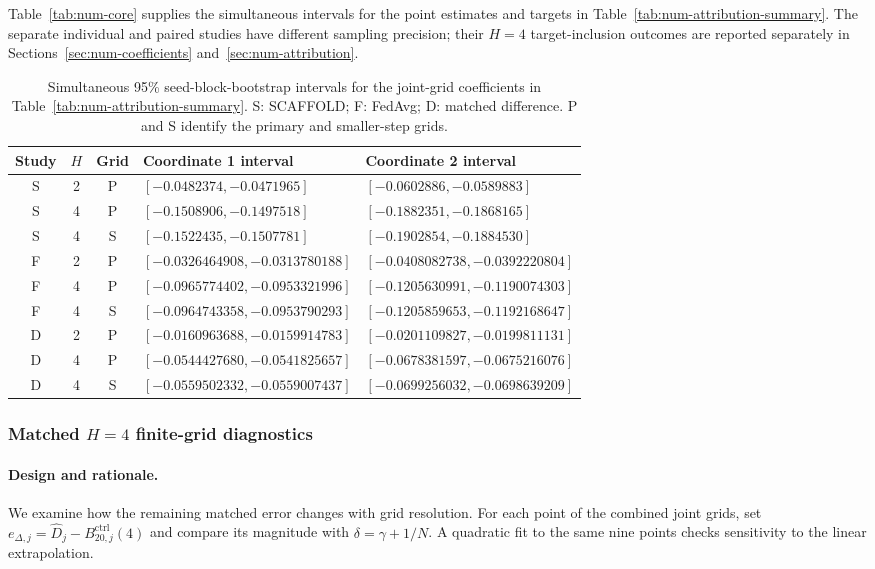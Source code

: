 Table~\ref{tab:num-core} supplies the simultaneous intervals for the point
estimates and targets in Table~\ref{tab:num-attribution-summary}.
The separate individual and paired studies have different sampling
precision; their $H=4$ target-inclusion outcomes are reported separately
in Sections~\ref{sec:num-coefficients} and~\ref{sec:num-attribution}.

\begin{table}[tbp]
\centering\small
\setlength{\tabcolsep}{4pt}
\caption{Simultaneous 95\% seed-block-bootstrap intervals for the
joint-grid coefficients in Table~\ref{tab:num-attribution-summary}.
S: SCAFFOLD; F: FedAvg; D: matched difference.
P and S identify the primary and smaller-step grids.}
\label{tab:num-core}
\label{tab:E-fa}
\label{tab:E-control}
\begin{tabular}{@{}cccll@{}}
\toprule
Study & $H$ & Grid & Coordinate 1 interval & Coordinate 2 interval \\
\midrule
S & 2 & P & $[-0.0482374,-0.0471965]$ & $[-0.0602886,-0.0589883]$ \\
S & 4 & P & $[-0.1508906,-0.1497518]$ & $[-0.1882351,-0.1868165]$ \\
S & 4 & S & $[-0.1522435,-0.1507781]$ & $[-0.1902854,-0.1884530]$ \\
\addlinespace
F & 2 & P & $[-0.0326464908,-0.0313780188]$ & $[-0.0408082738,-0.0392220804]$ \\
F & 4 & P & $[-0.0965774402,-0.0953321996]$ & $[-0.1205630991,-0.1190074303]$ \\
F & 4 & S & $[-0.0964743358,-0.0953790293]$ & $[-0.1205859653,-0.1192168647]$ \\
\addlinespace
D & 2 & P & $[-0.0160963688,-0.0159914783]$ & $[-0.0201109827,-0.0199811131]$ \\
D & 4 & P & $[-0.0544427680,-0.0541825657]$ & $[-0.0678381597,-0.0675216076]$ \\
D & 4 & S & $[-0.0559502332,-0.0559007437]$ & $[-0.0699256032,-0.0698639209]$ \\
\bottomrule
\end{tabular}
\end{table}

\subsubsection{Matched \texorpdfstring{$H=4$}{H=4} finite-grid diagnostics}
\label{app:num-h4-diagnostics}

\paragraph{Design and rationale.}
We examine how the remaining matched error changes with grid resolution.
For each point of the combined joint grids, set
$e_{\Delta,j}=\widehat D_j-B_{20,j}^{\mathrm{ctrl}}(4)$ and compare its
magnitude with $\delta=\gamma+1/N$. A quadratic fit to the same nine
points checks sensitivity to the linear extrapolation.

